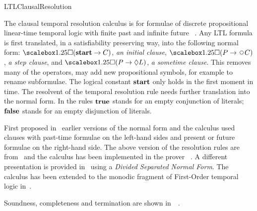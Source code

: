 \begin{entry}{LTLClausalResolution}
 \begin{clarifications}
The clausal temporal resolution calculus is for formulae of discrete propositional
linear-time temporal logic with finite past and infinite
future~\cite{Prior@OUP1967,Kamp@PhD1968} .
Any LTL formula is first translated, in a satisfiability preserving way, into the
following  normal form: 
$\Always(\lstart \rightarrow C)$, \emph{an initial clause},
$\Always(P \rightarrow \Next C)$, \emph{a step clause}, and
$\Always(P \rightarrow \sometime L)$, \emph{a sometime clause}.
%
This removes many of the operators, may add new propositional 
symbols, for example to rename subformulae.
%
The logical constant ${\bf start}$ only holds in the first moment in time. 
%
The resolvent of the temporal resolution rule needs further translation into
the normal form. 
%
In the rules ${\bf true}$ stands for an empty conjunction of literals; ${\bf false}$
stands for an empty disjunction of literals.
 \end{clarifications}

\begin{history}
First proposed in~\cite{Fis90-resolve} earlier versions of 
the normal form and the calculus used clauses with past-time formulae
on the left-hand sides and present or future formulae on the
right-hand side. The above version of the resolution rules are
from~\cite{FDP01} and the calculus has been implemented in the prover
\TRPpp~\cite{HustadtKonev2003a}. 
A different presentation is provided in~\cite{DFK02}
using a {\em Divided Separated Normal Form}.
The calculus has been extended to the monodic fragment of First-Order 
temporal logic in~.
\end{history}

\begin{technicalities}
Soundness, completeness and termination are shown in~~\cite{FDP01}.
\end{technicalities}



\end{entry}
